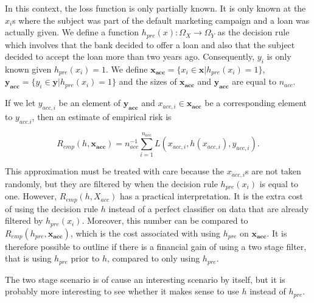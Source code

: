 \documentclass{article}
\theoremstyle{theorem}
\theoremstyle{definition}
\newcommand{\bv}[1]{\bm{#1}}
\begin{document}
In this context, the loss function is only partially known.  It is only known at the $x_i$s where the subject was part of the default marketing campaign and a loan was actually given.  We define a function $h_{pre}(x): \Omega_X \rightarrow \Omega_Y$ as the decision rule which involves that the bank decided to offer a loan and also that the subject decided to accept the loan more than two years ago.  Consequently, $y_i$ is only known given $h_{pre}(x_i) = 1$.  We define $\bv{x_{acc}} = \{x_i \in \bv{x} | h_{pre}(x_i) = 1\}$, $\bv{y_{acc}} = \{y_i \in \bv{y} | h_{pre}(x_i) = 1\}$ and the sizes of $\bv{x_{acc}} $ and $\bv{y_{acc}} $ are equal to $n_{acc}$.

If we let $y_{acc,i}$ be an element of $\bv{y_{acc}} $ and $x_{acc,i} \in \bv{x_{acc}} $ be a corresponding element to $y_{acc.i}$, then an estimate of empirical risk is 

\begin{equation}
\label{def:empRiskLimited}
R_{emp}(h, \bv{x_{acc}}) = n_{acc}^{-1} \sum_{i=1}^{n_{acc}} L(x_{acc,i}, h(x_{acc,i}), y_{acc,i}).
\end{equation}

This approximation must be treated with care because the $x_{acc,i}$s are not taken randomly, but they are filtered by when the decision rule $h_{pre}(x_i)$ is equal to one.  However, $R_{emp}(h, X_{acc})$ has a practical interpretation.  It is the extra cost of using the decision rule $h$ instead of a perfect classifier on data that are already filtered by $h_{pre}(x_i)$.  Moreover, this number can be compared to $R_{emp}(h_{pre}, \bv{x_{acc}})$, which is the cost associated with using $h_{pre}$ on $\bv{x_{acc}}$.  It is therefore possible to outline if there is a financial gain of using a two stage filter, that is using $h_{pre}$ prior to $h$, compared to only using $h_{pre}$.

The two stage scenario is of cause an interesting scenario by itself, but it is probably more interesting to see whether it makes sense to use $h$ instead of $h_{pre}$.  

%
%
\end{document}
